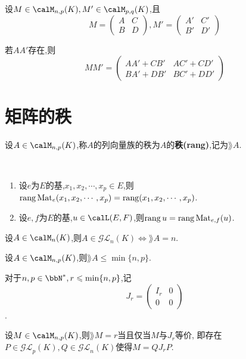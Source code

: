 \begin{prop}
    设$M \in \calM_{n, p}(K), M' \in \calM_{p, q}(K)$,且
    \[ M = \begin{pmatrix} A & C \\ B & D \end{pmatrix}, M' = \begin{pmatrix} A' & C' \\ B' & D' \end{pmatrix} \]

    若$AA'$存在,则
    \[ MM' = \begin{pmatrix} AA' + CB' & AC' + CD' \\ BA' + DB' & BC' + DD' \end{pmatrix} \]
\end{prop}

\section{矩阵的秩}

\begin{deff}
    设$A \in \calM_{n, p}(K)$,称$A$的列向量族的秩为$A$的\textbf{秩(rang)},记为$\rang A$.
\end{deff}

\begin{prop} $\ $
    \begin{enumerate}
        \item 设$e$为$E$的基,$x_1, x_2, \cdots, x_p \in E$,则$\operatorname{rang} \operatorname{Mat}_e(x_1, x_2, \cdots, x_p) = \operatorname{rang} (x_1, x_2, \cdots, x_p)$.
        \item 设$e, f$为$E$的基,$u \in \calL(E, F)$,则$\operatorname{rang} u = \operatorname{rang} \operatorname{Mat}_{e, f}(u)$.
    \end{enumerate}
\end{prop}

\begin{prop}
    设$A \in \calM_n(K)$,则$A \in \mathcal{GL}_n(K) \iff \rang A = n$.
\end{prop}

\begin{prop}
    设$A \in \calM_{n, p}(K)$,则$\rang A \leqslant \min \{ n, p \}$.
\end{prop}

对于$n, p \in \bbN^*, r \leqslant \min \{ n, p \}$,记
\[ J_r = \begin{pmatrix} I_r & 0 \\ 0 & 0 \end{pmatrix} \].

\begin{prop}
    设$M \in \calM_{n, p}(K)$,则$\rang M = r$当且仅当$M$与$J_r$等价,
    即存在$P \in \mathcal{GL}_p(K), Q \in \mathcal{GL}_n(K)$使得$M = QJ_rP$.
\end{prop}

